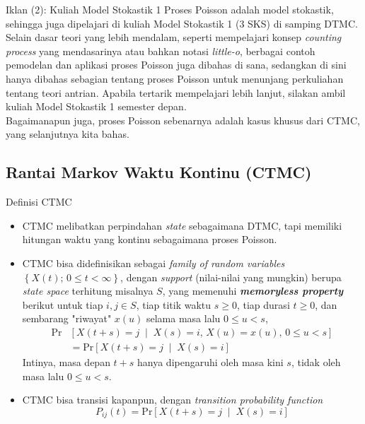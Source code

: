 \documentclass{beamer}
\newcommand{\pars}[1]{\left(#1\right)}
\newcommand{\brackets}[1]{\left[#1\right]}
\newcommand{\braces}[1]{\left\{#1\right\}}
\begin{document}
\begin{frame}{Iklan (2): Kuliah Model Stokastik 1}
    Proses Poisson adalah model stokastik, sehingga juga dipelajari di kuliah Model Stokastik 1 (3 SKS) di samping DTMC. Selain dasar teori yang lebih mendalam, seperti mempelajari konsep \textit{counting process} yang mendasarinya atau bahkan notasi \textit{little-o}, berbagai contoh pemodelan dan aplikasi proses Poisson juga dibahas di sana, sedangkan di sini hanya dibahas sebagian tentang proses Poisson untuk menunjang perkuliahan tentang teori antrian. Apabila tertarik mempelajari lebih lanjut, silakan ambil kuliah Model Stokastik 1 semester depan. \\[0.5em]
    
    Bagaimanapun juga, proses Poisson sebenarnya adalah kasus khusus dari CTMC, yang selanjutnya kita bahas.
\end{frame}

\subsection{Rantai Markov Waktu Kontinu (CTMC)}

\begin{frame}{Definisi CTMC}
    \begin{itemize}
        \item CTMC melibatkan perpindahan \textit{state} sebagaimana DTMC, tapi memiliki hitungan waktu yang kontinu sebagaimana proses Poisson.
        \item CTMC bisa didefinisikan sebagai \textit{family of random variables} \(\braces{X(t); \, 0 \le t < \infty}\), dengan \textit{support} (nilai-nilai yang mungkin) berupa \textit{state space} terhitung misalnya \(S\), yang memenuhi \textbf{\textit{memoryless property}} berikut untuk tiap \(i, j \in S\), tiap titik waktu \(s \ge 0\), tiap durasi \(t \ge 0\), dan sembarang "riwayat" \(x(u)\) selama masa lalu \(0 \le u < s\),
        \begin{align*}
            \text{Pr}&\brackets{X\pars{t+s} = j \; \middle| \; X\pars{s} = i, \, X(u) = x(u), \, 0 \le u < s} \\
            &= \text{Pr}\brackets{X\pars{t+s} = j \; \middle| \; X\pars{s} = i}
        \end{align*}
        Intinya, masa depan \(t+s\) hanya dipengaruhi oleh masa kini \(s\), tidak oleh masa lalu \(0 \le u < s\).
        \item CTMC bisa transisi kapanpun, dengan \textit{transition probability function}
        \[P_{ij}\pars{t} = \text{Pr}\brackets{X\pars{t+s} = j \; \middle| \; X\pars{s} = i}\]
    \end{itemize}
\end{frame}
\end{document}
